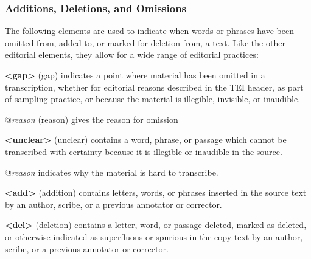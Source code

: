 \subsubsection[{Additions, Deletions, and Omissions}]{Additions, Deletions, and Omissions}\label{COEDADD}\par
The following elements are used to indicate when words or phrases have been omitted from, added to, or marked for deletion from, a text. Like the other editorial elements, they allow for a wide range of editorial practices: 
\begin{sansreflist}
  
\item [\textbf{<gap>}] (gap) indicates a point where material has been omitted in a transcription, whether for editorial reasons described in the TEI header, as part of sampling practice, or because the material is illegible, invisible, or inaudible.\hfil\\[-10pt]\begin{sansreflist}
    \item[@{\itshape reason}]
  (reason) gives the reason for omission
\end{sansreflist}  
\item [\textbf{<unclear>}] (unclear) contains a word, phrase, or passage which cannot be transcribed with certainty because it is illegible or inaudible in the source.\hfil\\[-10pt]\begin{sansreflist}
    \item[@{\itshape reason}]
  indicates why the material is hard to transcribe.
\end{sansreflist}  
\item [\textbf{<add>}] (addition) contains letters, words, or phrases inserted in the source text by an author, scribe, or a previous annotator or corrector.
\item [\textbf{<del>}] (deletion) contains a letter, word, or passage deleted, marked as deleted, or otherwise indicated as superfluous or spurious in the copy text by an author, scribe, or a previous annotator or corrector.
\end{sansreflist}
\par
